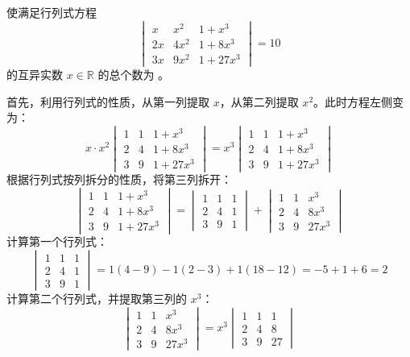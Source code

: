 \begin{questions}
    \question 使满足行列式方程
\[
\begin{vmatrix} x & x^2 & 1 + x^3 \\ 2x & 4x^2 & 1 + 8x^3 \\ 3x & 9x^2 & 1 + 27x^3 \end{vmatrix} = 10
\]
的互异实数 $x \in \mathbb{R}$ 的总个数为 \underline{\hspace{1cm}}。

\begin{solution}
首先，利用行列式的性质，从第一列提取 $x$，从第二列提取 $x^2$。此时方程左侧变为：
\[
x \cdot x^2 \begin{vmatrix} 1 & 1 & 1 + x^3 \\ 2 & 4 & 1 + 8x^3 \\ 3 & 9 & 1 + 27x^3 \end{vmatrix} = x^3 \begin{vmatrix} 1 & 1 & 1 + x^3 \\ 2 & 4 & 1 + 8x^3 \\ 3 & 9 & 1 + 27x^3 \end{vmatrix}
\]
根据行列式按列拆分的性质，将第三列拆开：
\[
\begin{vmatrix} 1 & 1 & 1 + x^3 \\ 2 & 4 & 1 + 8x^3 \\ 3 & 9 & 1 + 27x^3 \end{vmatrix} = \begin{vmatrix} 1 & 1 & 1 \\ 2 & 4 & 1 \\ 3 & 9 & 1 \end{vmatrix} + \begin{vmatrix} 1 & 1 & x^3 \\ 2 & 4 & 8x^3 \\ 3 & 9 & 27x^3 \end{vmatrix}
\]
计算第一个行列式：
\[
\begin{vmatrix} 1 & 1 & 1 \\ 2 & 4 & 1 \\ 3 & 9 & 1 \end{vmatrix} = 1(4 - 9) - 1(2 - 3) + 1(18 - 12) = -5 + 1 + 6 = 2
\]
计算第二个行列式，并提取第三列的 $x^3$：
\[
\begin{vmatrix} 1 & 1 & x^3 \\ 2 & 4 & 8x^3 \\ 3 & 9 & 27x^3 \end{vmatrix} = x^3 \begin{vmatrix} 1 & 1 & 1 \\ 2 & 4 & 8 \\ 3 & 9 & 27 \end{vmatrix}
\]
\end{solution}
\end{questions}
